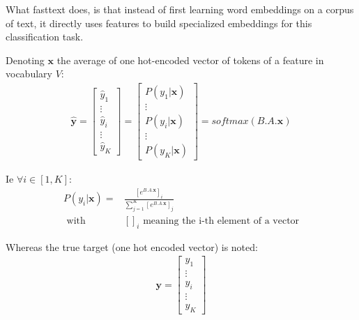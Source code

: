 What fasttext does, is that instead of first learning word embeddings on a corpus of text, it directly uses features to build specialized embeddings for this classification task.

Denoting $\mathbf{x}$ the average of one hot-encoded vector of tokens of a feature in vocabulary $V$:
\begin{align}
 \mathbf{\hat y} 
 = 
	\begin{bmatrix} 
		\hat y_1 \\
		\vdots \\
		\hat y_i\\
		\vdots \\
		\hat y_K
	\end{bmatrix} 
 =	\begin{bmatrix} 
		P(y_1 | \mathbf{x}) \\
		\vdots \\
		P(y_i | \mathbf{x})\\
		\vdots \\
		P(y_K | \mathbf{x})
	\end{bmatrix} = 
	softmax(B.A.\mathbf{x})
\end{align}

Ie $\forall i \in [1, K]$:
\begin{align}
 P(y_i | \mathbf{x})= 
 	&\frac{  [e^{B.A.\mathbf{x}}]_i}
 	{\sum_{j=1}^{K} [e^{B.A.\mathbf{x}}]_j} \\
 	\text{      with}& []_i \text{ meaning the i-th element of a vector}
\end{align}


Whereas the true target (one hot encoded vector) is noted:
\begin{align}
 \mathbf{y} = 
	\begin{bmatrix} 
		y_1 \\
		\vdots \\
		y_i \\
		\vdots \\
		y_K
	\end{bmatrix} 
\end{align}


